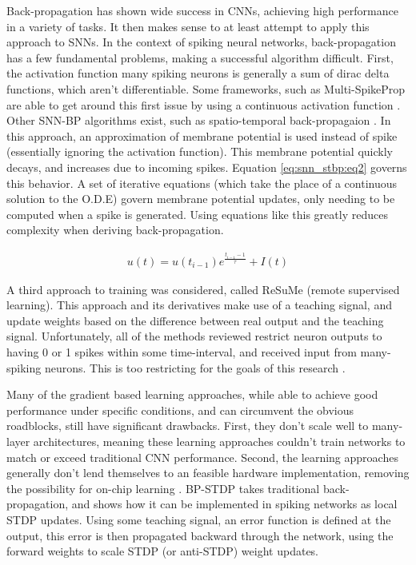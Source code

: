     Back-propagation has shown wide success in CNNs, achieving high performance
    in a variety of tasks. It then makes sense to at least attempt to apply this
    approach to SNNs. In the context of spiking neural networks,
    back-propagation has a few fundamental problems, making a successful
    algorithm difficult. First, the activation function many spiking neurons is
    generally a sum of dirac delta functions, which aren't differentiable. Some
    frameworks, such as Multi-SpikeProp are able to get around this first issue
    by using a continuous activation function \cite{deep_spike}. Other SNN-BP
    algorithms exist, such as spatio-temporal back-propagaion
    \cite{snn_stbp}. In this approach, an approximation of membrane potential is
    used instead of spike (essentially ignoring the activation function). This
    membrane potential quickly decays, and increases due to incoming
    spikes. Equation \ref{eq:snn_stbp:eq2} governs this behavior. A set of
    iterative equations (which take the place of a continuous solution to the
    O.D.E) govern membrane potential updates, only needing to be computed when a
    spike is generated. Using equations like this greatly reduces complexity
    when deriving back-propagation.
    
    \begin{align}
        u(t) = u(t_{i-1})e^{\frac{t_{i-1} - 1}{\tau}} +
        I(t) \label{eq:snn_stbp:eq2}
    \end{align}
    
    A third approach to training was considered, called ReSuMe (remote
    supervised learning). This approach and its derivatives make use of a
    teaching signal, and update weights based on the difference between real
    output and the teaching signal. Unfortunately, all of the methods reviewed
    restrict neuron outputs to having 0 or 1 spikes within some time-interval,
    and received input from many-spiking neurons. This is too restricting for
    the goals of this research \cite{deep_spike}.
    
    Many of the gradient based learning approaches, while able to achieve good
    performance under specific conditions, and can circumvent the obvious
    roadblocks, still have significant drawbacks. First, they don't scale well
    to many-layer architectures, meaning these learning approaches couldn't
    train networks to match or exceed traditional CNN performance. Second, the
    learning approaches generally don't lend themselves to an feasible hardware
    implementation, removing the possibility for on-chip learning
    \cite{bp_stdp}. BP-STDP takes traditional back-propagation, and shows how it
    can be implemented in spiking networks as local STDP updates. Using some
    teaching signal, an error function is defined at the output, this error is
    then propagated backward through the network, using the forward weights to
    scale STDP (or anti-STDP) weight updates.
    

